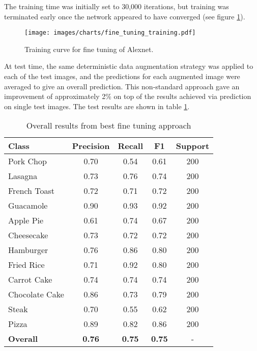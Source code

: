 \documentclass[10pt,a4paper]{article}
\begin{document}
The training time was initially set to 30,000 iterations, but training was terminated early once the network appeared to have converged (see figure \ref{fig:training_curve}).

\begin{figure}[h]
\begin{framed}
  \caption{Training curve for fine tuning of Alexnet.}
  \texttt{[image: images/charts/fine\_tuning\_training.pdf]}
  \label{fig:training_curve}
\end{framed}
\end{figure}

At test time, the same deterministic data augmentation strategy was applied to each of the test images, and the predictions for each augmented image were averaged to give an overall prediction. This non-standard approach gave an improvement of approximately 2\% on top of the results achieved via prediction on single test images. The test results are shown in table \ref{table:fine-tuning-2}.

\begin{table}[h]
\small
\setlength\extrarowheight{2pt}
\caption{Overall results from best fine tuning approach}
\begin{tabular}{l c c c c}
\hline
\textbf{Class} & \textbf{Precision} & \textbf{Recall} & \textbf{F1} & \textbf{Support} \\
\hline
Pork Chop & 0.70 & 0.54 & 0.61 & 200\\
Lasagna & 0.73 & 0.76 & 0.74 & 200\\
French Toast & 0.72 & 0.71 & 0.72 & 200\\
Guacamole & 0.90 & 0.93 & 0.92 & 200\\
Apple Pie & 0.61 & 0.74 & 0.67 & 200\\
Cheesecake & 0.73 & 0.72 & 0.72 & 200\\
Hamburger & 0.76 & 0.86 & 0.80 & 200\\
Fried Rice & 0.71 & 0.92 & 0.80 & 200\\
Carrot Cake & 0.74 & 0.74 & 0.74 & 200\\
Chocolate Cake & 0.86 & 0.73 & 0.79 & 200\\
Steak & 0.70 & 0.55 & 0.62 & 200\\
Pizza & 0.89 & 0.82 & 0.86 & 200\\
\hline
\hline
\textbf{Overall} & \textbf{0.76} & \textbf{0.75} & \textbf{0.75} & -\\
\hline
\hline
\end{tabular}
\label{table:fine-tuning-2}
\end{table}
\end{document}
